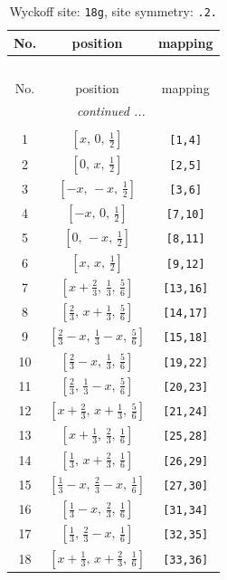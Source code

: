 \documentclass[fleqn,8pt]{jsarticle}
\begin{document}
\renewcommand{\arraystretch}{1.2}
\begin{longtable}{ccc}
\caption{Wyckoff site: {\tt 18g}, site symmetry: {\tt .2.}}
 \\
 \hline \hline
No. & position & mapping \\ \hline \endfirsthead

\multicolumn{2}{l}{\tablename\ \thetable{}} \\
 \hline \hline
No. & position & mapping \\ \hline \endhead

 \hline \hline
\multicolumn{2}{r}{\footnotesize\it continued ...} \\ \endfoot

 \hline \hline
\multicolumn{2}{r}{} \\ \endlastfoot

1 & $\left[ x,\, 0,\, \frac{1}{2} \right]$ & {\tt [1,4]} \\ \hline
2 & $\left[ 0,\, x,\, \frac{1}{2} \right]$ & {\tt [2,5]} \\ \hline
3 & $\left[ - x,\, - x,\, \frac{1}{2} \right]$ & {\tt [3,6]} \\ \hline
4 & $\left[ - x,\, 0,\, \frac{1}{2} \right]$ & {\tt [7,10]} \\ \hline
5 & $\left[ 0,\, - x,\, \frac{1}{2} \right]$ & {\tt [8,11]} \\ \hline
6 & $\left[ x,\, x,\, \frac{1}{2} \right]$ & {\tt [9,12]} \\ \hline
7 & $\left[ x + \frac{2}{3},\, \frac{1}{3},\, \frac{5}{6} \right]$ & {\tt [13,16]} \\ \hline
8 & $\left[ \frac{2}{3},\, x + \frac{1}{3},\, \frac{5}{6} \right]$ & {\tt [14,17]} \\ \hline
9 & $\left[ \frac{2}{3} - x,\, \frac{1}{3} - x,\, \frac{5}{6} \right]$ & {\tt [15,18]} \\ \hline
10 & $\left[ \frac{2}{3} - x,\, \frac{1}{3},\, \frac{5}{6} \right]$ & {\tt [19,22]} \\ \hline
11 & $\left[ \frac{2}{3},\, \frac{1}{3} - x,\, \frac{5}{6} \right]$ & {\tt [20,23]} \\ \hline
12 & $\left[ x + \frac{2}{3},\, x + \frac{1}{3},\, \frac{5}{6} \right]$ & {\tt [21,24]} \\ \hline
13 & $\left[ x + \frac{1}{3},\, \frac{2}{3},\, \frac{1}{6} \right]$ & {\tt [25,28]} \\ \hline
14 & $\left[ \frac{1}{3},\, x + \frac{2}{3},\, \frac{1}{6} \right]$ & {\tt [26,29]} \\ \hline
15 & $\left[ \frac{1}{3} - x,\, \frac{2}{3} - x,\, \frac{1}{6} \right]$ & {\tt [27,30]} \\ \hline
16 & $\left[ \frac{1}{3} - x,\, \frac{2}{3},\, \frac{1}{6} \right]$ & {\tt [31,34]} \\ \hline
17 & $\left[ \frac{1}{3},\, \frac{2}{3} - x,\, \frac{1}{6} \right]$ & {\tt [32,35]} \\ \hline
18 & $\left[ x + \frac{1}{3},\, x + \frac{2}{3},\, \frac{1}{6} \right]$ & {\tt [33,36]} \\
\end{longtable}
\end{document}
